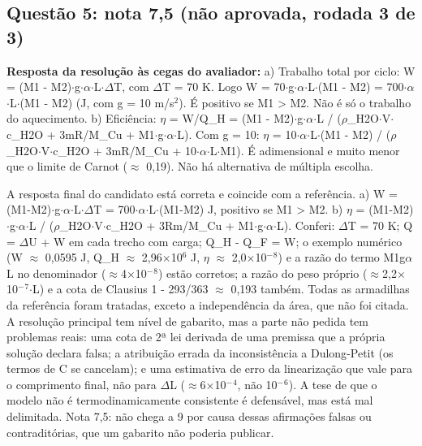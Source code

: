 \documentclass{article}%
\begin{document}
\subsection*{Questão 5: nota 7,5 (não aprovada, rodada 3 de 3)}%
\textbf{Resposta da resolução às cegas do avaliador:} a) Trabalho total por ciclo: W = (M1 - M2)$\cdot$g$\cdot$$\alpha$$\cdot$L$\cdot$$\Delta$T, com $\Delta$T = 70 K. Logo W = 70$\cdot$g$\cdot$$\alpha$$\cdot$L$\cdot$(M1 - M2) = 700$\cdot$$\alpha$$\cdot$L$\cdot$(M1 - M2) (J, com g = 10 m/s$^2$). É positivo se M1 > M2. Não é só o trabalho do aquecimento.\newline%
\newline%
b) Eficiência: $\eta$ = W/Q\_H = (M1 - M2)$\cdot$g$\cdot$$\alpha$$\cdot$L / ($\rho$\_H2O$\cdot$V$\cdot$c\_H2O + 3mR/M\_Cu + M1$\cdot$g$\cdot$$\alpha$$\cdot$L). Com g = 10: $\eta$ = 10$\cdot$$\alpha$$\cdot$L$\cdot$(M1 - M2) / ($\rho$\_H2O$\cdot$V$\cdot$c\_H2O + 3mR/M\_Cu + 10$\cdot$$\alpha$$\cdot$L$\cdot$M1). É adimensional e muito menor que o limite de Carnot ($\approx$ 0,19). Não há alternativa de múltipla escolha.\par %
A resposta final do candidato está correta e coincide com a referência. a) W = (M1-M2)$\cdot$g$\cdot$$\alpha$$\cdot$L$\cdot$$\Delta$T = 700$\cdot$$\alpha$$\cdot$L$\cdot$(M1-M2) J, positivo se M1 > M2. b) $\eta$ = (M1-M2)$\cdot$g$\cdot$$\alpha$$\cdot$L / ($\rho$\_H2O$\cdot$V$\cdot$c\_H2O + 3Rm/M\_Cu + M1$\cdot$g$\cdot$$\alpha$$\cdot$L). Conferi: $\Delta$T = 70 K; Q = $\Delta$U + W em cada trecho com carga; Q\_H - Q\_F = W; o exemplo numérico (W $\approx$ 0,0595 J, Q\_H $\approx$ 2,96$\times$10$^{6}$ J, $\eta$ $\approx$ 2,0$\times$10$^{-}$$^{8}$) e a razão do termo M1g$\alpha$L no denominador ($\approx$4$\times$10$^{-}$$^{8}$) estão corretos; a razão do peso próprio ($\approx$2,2$\times$10$^{-}$$^{7}$$\cdot$L) e a cota de Clausius 1 - 293/363 $\approx$ 0,193 também. Todas as armadilhas da referência foram tratadas, exceto a independência da área, que não foi citada. A resolução principal tem nível de gabarito, mas a parte não pedida tem problemas reais: uma cota de 2ª lei derivada de uma premissa que a própria solução declara falsa; a atribuição errada da inconsistência a Dulong{-}Petit (os termos de C se cancelam); e uma estimativa de erro da linearização que vale para o comprimento final, não para $\Delta$L ($\approx$6$\times$10$^{-}$$^{4}$, não 10$^{-}$$^{6}$). A tese de que o modelo não é termodinamicamente consistente é defensável, mas está mal delimitada. Nota 7,5: não chega a 9 por causa dessas afirmações falsas ou contraditórias, que um gabarito não poderia publicar.%
\end{document}
